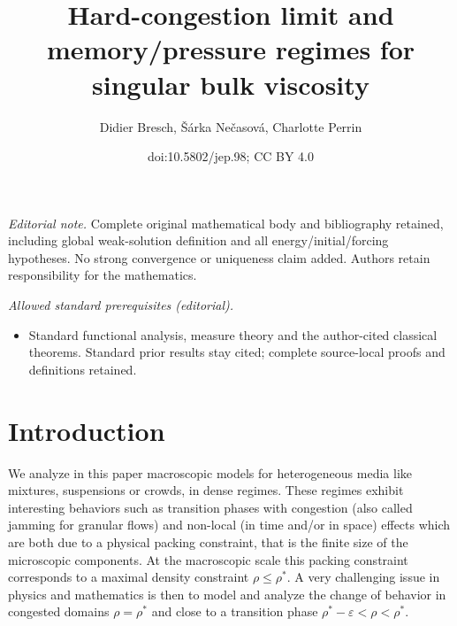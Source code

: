 \documentclass[10pt]{amsart}
\title{Hard-congestion limit and memory/pressure regimes for singular bulk viscosity}
\author{Didier Bresch, Šárka Nečasová, Charlotte Perrin}
\date{doi:10.5802/jep.98; CC BY 4.0}
\newcommand{\<}{\bigl\langle}
\renewcommand{\>}{\bigr\rangle}
\theoremstyle{definition}
\theoremstyle{remark}
\let\ep\varepsilon
\begin{document}
\maketitle
\noindent\textit{Editorial note.} Complete original mathematical body and bibliography retained, including global weak-solution definition and all energy/initial/forcing hypotheses. No strong convergence or uniqueness claim added. Authors retain responsibility for the mathematics.\par\medskip
\noindent\textit{Allowed standard prerequisites (editorial).}\begin{itemize}
\item Standard functional analysis, measure theory and the author-cited classical theorems. Standard prior results stay cited; complete source-local proofs and definitions retained.
\end{itemize}\medskip
\vspace*{-\baselineskip}\enlargethispage{\baselineskip}
\tableofcontents


\section*{Introduction}
We analyze in this paper macroscopic models for heterogeneous media like mixtures, suspensions or crowds, in dense regimes. These regimes exhibit interesting behaviors such as transition phases with congestion (also called jamming for granular flows) and non-local (in time and/or in space) effects which are both due to a physical packing constraint, that is the finite size of the microscopic components. At the macroscopic scale this packing constraint corresponds to a maximal density constraint $ \rho \leq \rho^*$. A very challenging issue in physics and mathematics is then to model and analyze the change of behavior in congested domains $\rho = \rho^*$ and close to a transition phase $\rho^*-\ep<\rho<\rho^*$.\enlargethispage{.5\baselineskip}%
\end{document}
